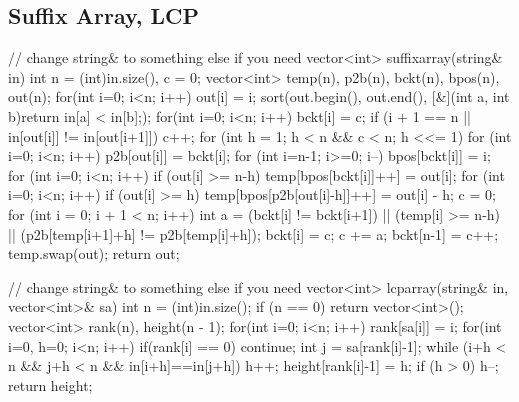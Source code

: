 \subsection{Suffix Array, LCP}
\begin{cpp}
// change string& to something else if you need
vector<int> suffixarray(string& in) {
  int n = (int)in.size(), c = 0;
  vector<int> temp(n), p2b(n), bckt(n), bpos(n), out(n);
  for(int i=0; i<n; i++) out[i] = i;
  sort(out.begin(), out.end(),
       [&](int a, int b){return in[a] < in[b];});
  for(int i=0; i<n; i++) {
    bckt[i] = c;
    if (i + 1 == n || in[out[i]] != in[out[i+1]]) c++;
  }
  for (int h = 1; h < n && c < n; h <<= 1) {
    for (int i=0; i<n; i++) p2b[out[i]] = bckt[i];
    for (int i=n-1; i>=0; i--) bpos[bckt[i]] = i;
    for (int i=0; i<n; i++) if (out[i] >= n-h)
      temp[bpos[bckt[i]]++] = out[i];
    for (int i=0; i<n; i++) if (out[i] >= h)
      temp[bpos[p2b[out[i]-h]]++] = out[i] - h;
    c = 0;
    for (int i = 0; i + 1 < n; i++) {
      int a = (bckt[i] != bckt[i+1]) || (temp[i] >= n-h)
          || (p2b[temp[i+1]+h] != p2b[temp[i]+h]);
      bckt[i] = c; c += a;
    }
    bckt[n-1] = c++;
    temp.swap(out);
  }
  return out;
}

// change string& to something else if you need
vector<int> lcparray(string& in, vector<int>& sa) {
  int n = (int)in.size();
  if (n == 0) return vector<int>();
  vector<int> rank(n), height(n - 1);
  for(int i=0; i<n; i++) rank[sa[i]] = i;
  for(int i=0, h=0; i<n; i++){
    if(rank[i] == 0) continue;
    int j = sa[rank[i]-1];
    while (i+h < n && j+h < n && in[i+h]==in[j+h]) h++;
    height[rank[i]-1] = h;
    if (h > 0) h--;
  }
  return height;
}
\end{cpp}